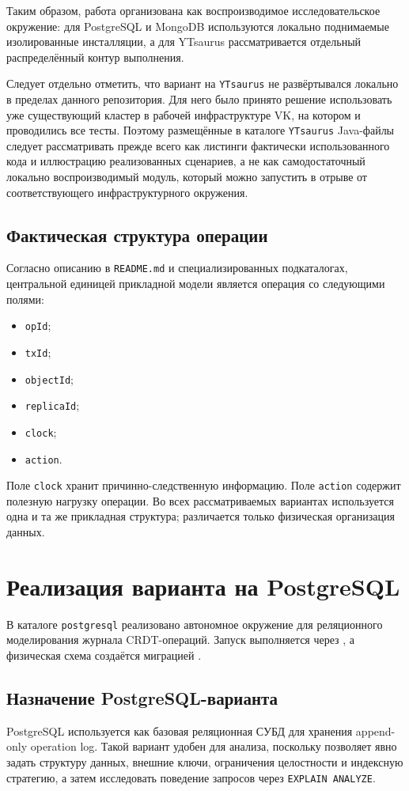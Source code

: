 \documentclass[a4paper,14pt]{extarticle}
\def\uppercase#1{#1}%
\def\makefirstuc#1{#1}%
\def\normalsize{}%
\newcommand{\withnumber}[1]{%
    \clearpage
    \section{\uppercase{#1}}
}
\newcommand{\mysubsection}[1]{%
    \subsection{\normalsize\makefirstuc{#1}}
}
\begin{document}
Таким образом, работа организована как воспроизводимое исследовательское
окружение: для PostgreSQL и MongoDB используются локально поднимаемые
изолированные инсталляции, а для YTsaurus рассматривается отдельный
распределённый контур выполнения.

Следует отдельно отметить, что вариант на \texttt{YTsaurus} не развёртывался
локально в пределах данного репозитория. Для него было принято решение
использовать уже существующий кластер в рабочей инфраструктуре VK, на котором
и проводились все тесты. Поэтому размещённые в каталоге \texttt{YTsaurus}
Java-файлы следует рассматривать прежде всего как листинги фактически
использованного кода и иллюстрацию реализованных сценариев, а не как
самодостаточный локально воспроизводимый модуль, который можно запустить в
отрыве от соответствующего инфраструктурного окружения.

\mysubsection{Фактическая структура операции}

Согласно описанию в \texttt{README.md} и специализированных подкаталогах,
центральной единицей прикладной модели является операция со следующими полями:
\begin{itemize}[leftmargin=1.25cm]
    \item \texttt{opId};
    \item \texttt{txId};
    \item \texttt{objectId};
    \item \texttt{replicaId};
    \item \texttt{clock};
    \item \texttt{action}.
\end{itemize}

Поле \texttt{clock} хранит причинно-следственную информацию.
Поле \texttt{action} содержит полезную нагрузку операции.
Во всех рассматриваемых вариантах используется одна и та же прикладная структура;
различается только физическая организация данных.

\withnumber{Реализация варианта на PostgreSQL}

В каталоге \texttt{postgresql} реализовано автономное окружение для
реляционного моделирования журнала CRDT-операций. Запуск выполняется через
, а физическая схема
создаётся миграцией .

\mysubsection{Назначение PostgreSQL-варианта}

PostgreSQL используется как базовая реляционная СУБД для хранения append-only
operation log. Такой вариант удобен для анализа, поскольку позволяет явно задать
структуру данных, внешние ключи, ограничения целостности и индексную стратегию,
а затем исследовать поведение запросов через \texttt{EXPLAIN ANALYZE}.
\end{document}
